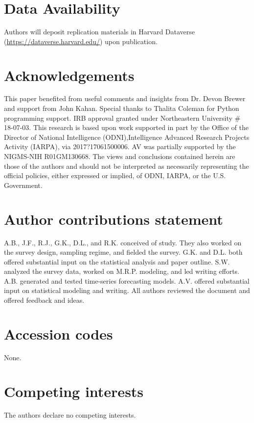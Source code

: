 \documentclass[fleqn,10pt]{wlscirep}
\begin{document}


\section*{Data Availability}
Authors will deposit replication materials in Harvard Dataverse (\url{https://dataverse.harvard.edu/}) upon publication. 






\section*{Acknowledgements}

This paper benefited from useful comments and insights from Dr. Devon Brewer and support from John Kahan. Special thanks to Thalita Coleman for Python programming support. IRB approval granted under Northeastern University \# 18-07-03. This research is based upon work supported in part by the Office of the Director of National Intelligence (ODNI),Intelligence Advanced Research Projects Activity (IARPA), via 2017?17061500006. AV was partially supported by the NIGMS-NIH R01GM130668. The views and conclusions contained herein are those of the authors and should not be interpreted as necessarily representing the official policies, either expressed or implied, of ODNI, IARPA, or the U.S. Government.

\section*{Author contributions statement}

A.B., J.F., R.J., G.K., D.L., and R.K. conceived of study. They also worked on the survey design, sampling regime, and fielded the survey. G.K. and D.L. both offered substantial input on the statistical analysis and paper outline. S.W. analyzed the survey data, worked on M.R.P. modeling, and led writing efforts. A.B. generated and tested time-series forecasting models. A.V. offered substantial input on statistical modeling and writing. All authors reviewed the document and offered feedback and ideas. 

\section*{Accession codes}
None.

\section*{Competing interests}

The authors declare no competing interests. 
\end{document}

